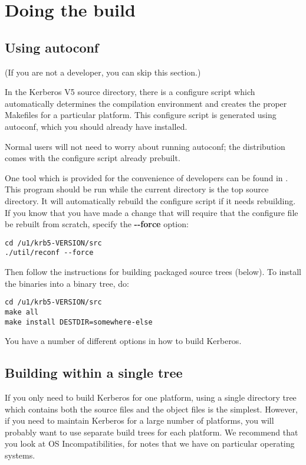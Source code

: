 \documentclass[letterpaper,10pt,english]{sphinxmanual}
\begin{document}
\section{Doing the build}
\label{build/doing_build::doc}\label{build/doing_build:doing-the-build}

\subsection{Using autoconf}
\label{build/doing_build:using-autoconf}
(If you are not a developer, you can skip this section.)

In the Kerberos V5 source directory, there is a configure script which
automatically determines the compilation environment and creates the
proper Makefiles for a particular platform.  This configure script is
generated using autoconf, which you should already have installed.

Normal users will not need to worry about running autoconf; the
distribution comes with the configure script already prebuilt.

One tool which is provided for the convenience of developers can be
found in .  This program should be run while the
current directory is the top source directory.  It will automatically
rebuild the configure script if it needs rebuilding.  If you know that
you have made a change that will require that the configure file be
rebuilt from scratch, specify the \textbf{-}\textbf{-force} option:

\begin{Verbatim}[commandchars=\\\{\}]
cd /u1/krb5-VERSION/src
./util/reconf --force
\end{Verbatim}

Then follow the instructions for building packaged source trees
(below).  To install the binaries into a binary tree, do:

\begin{Verbatim}[commandchars=\\\{\}]
cd /u1/krb5-VERSION/src
make all
make install DESTDIR=somewhere-else
\end{Verbatim}

You have a number of different options in how to build Kerberos.


\subsection{Building within a single tree}
\label{build/doing_build:do-build}\label{build/doing_build:building-within-a-single-tree}
If you only need to build Kerberos for one platform, using a single
directory tree which contains both the source files and the object
files is the simplest.  However, if you need to maintain Kerberos for
a large number of platforms, you will probably want to use separate
build trees for each platform.  We recommend that you look at OS
Incompatibilities, for notes that we have on particular operating
systems.
\end{document}
